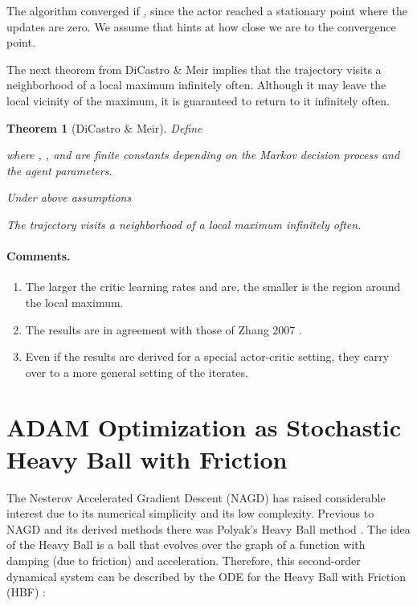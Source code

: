 \documentclass{article}
\newtheorem{theorem}{Theorem}
\begin{document}
The algorithm converged if , since the actor reached a stationary point where the updates
are zero.
We assume that 
hints at how close we are to the convergence point.

The next theorem from DiCastro \& Meir \cite{DiCastro:10}
implies that the trajectory visits a neighborhood of
a local maximum infinitely often.
Although it may leave the local vicinity of the maximum, it is
guaranteed to return to it infinitely often.


\begin{theorem}[DiCastro \& Meir]
\label{th:DiCastro}
Define

where , , and
 are finite constants depending on the Markov
decision process and the agent parameters.


Under above assumptions

The trajectory visits a neighborhood of
a local maximum infinitely often.
\end{theorem}





\paragraph{Comments.}
\begin{enumerate}[label=\textbf{(C\arabic*)}]
\item
The larger the critic learning rates
 and  are,
the smaller is the region around the local maximum.

\item
The results are in agreement with those of Zhang 2007 \cite{Zhang:07}.

\item
Even if the results are derived for a special actor-critic setting,
they carry over to a more general setting of the iterates.


\end{enumerate}


\section{ADAM Optimization as Stochastic Heavy Ball with Friction}
\label{sec:adam}


The Nesterov Accelerated Gradient
Descent (NAGD) \cite{Nesterov:83} has raised considerable interest due to its numerical
simplicity and its low complexity. Previous to NAGD and its derived
methods there was Polyak's Heavy Ball method \cite{Polyak:64}.
The idea of the Heavy Ball is a ball that evolves over the graph of a function 
with damping (due to friction) and acceleration. Therefore, this
second-order dynamical system can be described by the ODE for the
Heavy Ball with Friction (HBF) \cite{Gadat:16}:
\end{document}
